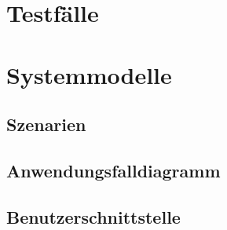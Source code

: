 \documentclass[a4paper]{scrreprt}
\begin{document}
    \chapter{Testfälle}

    \chapter{Systemmodelle}
        \section{Szenarien}

        \newpage
        \section{Anwendungsfalldiagramm}

        \newpage
        \section{Benutzerschnittstelle}

    \glsaddall
    \printglossary

    \listoffigures
\end{document}
